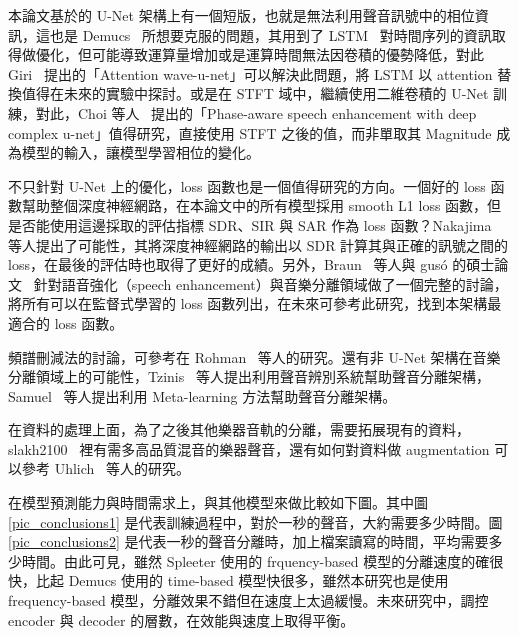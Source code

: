 本論文基於的 U-Net 架構上有一個短版，也就是無法利用聲音訊號中的相位資訊，這也是 Demucs~\cite{defossez2019music} 所想要克服的問題，其用到了 LSTM~\cite{gers1999learning} 對時間序列的資訊取得做優化，但可能導致運算量增加或是運算時間無法因卷積的優勢降低，對此 Giri~\cite{giri2019attention} 提出的「Attention wave-u-net」可以解決此問題，將 LSTM 以 attention 替換值得在未來的實驗中探討。或是在 STFT 域中，繼續使用二維卷積的 U-Net 訓練，對此，Choi 等人~\cite{choi2018phase} 提出的「Phase-aware speech enhancement with deep complex u-net」值得研究，直接使用 STFT 之後的值，而非單取其 Magnitude 成為模型的輸入，讓模型學習相位的變化。

不只針對 U-Net 上的優化，loss 函數也是一個值得研究的方向。一個好的 loss 函數幫助整個深度神經網路，在本論文中的所有模型採用 smooth L1 loss 函數，但是否能使用這邊採取的評估指標 SDR、SIR 與 SAR 作為 loss 函數？Nakajima~\cite{nakajima2018monaural} 等人提出了可能性，其將深度神經網路的輸出以 SDR 計算其與正確的訊號之間的 loss，在最後的評估時也取得了更好的成績。另外，Braun~\cite{braun2020consolidated} 等人與 gusó 的碩士論文~\cite{guso2020on_loss_functions} 針對語音強化（speech enhancement）與音樂分離領域做了一個完整的討論，將所有可以在監督式學習的 loss 函數列出，在未來可參考此研究，找到本架構最適合的 loss 函數。

頻譜刪減法的討論，可參考在 Rohman~\cite{rohman2016novel} 等人的研究。還有非 U-Net 架構在音樂分離領域上的可能性，Tzinis~\cite{tzinis2020improving} 等人提出利用聲音辨別系統幫助聲音分離架構，Samuel~\cite{samuel2020meta} 等人提出利用 Meta-learning 方法幫助聲音分離架構。

在資料的處理上面，為了之後其他樂器音軌的分離，需要拓展現有的資料，slakh2100~\cite{manilow2019cutting} 裡有需多高品質混音的樂器聲音，還有如何對資料做 augmentation 可以參考 Uhlich~\cite{uhlich2017improving} 等人的研究。

在模型預測能力與時間需求上，與其他模型來做比較如下圖。其中圖\ref{pic_conclusions1} 是代表訓練過程中，對於一秒的聲音，大約需要多少時間。圖\ref{pic_conclusions2} 是代表一秒的聲音分離時，加上檔案讀寫的時間，平均需要多少時間。由此可見，雖然 Spleeter 使用的 frquency-based 模型的分離速度的確很快，比起 Demucs 使用的 time-based 模型快很多，雖然本研究也是使用 frequency-based 模型，分離效果不錯但在速度上太過緩慢。未來研究中，調控 encoder 與 decoder 的層數，在效能與速度上取得平衡。

